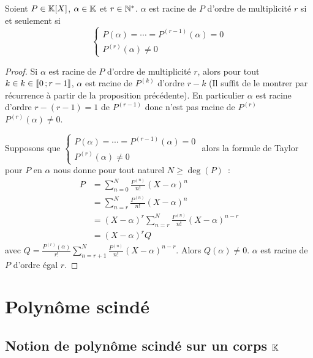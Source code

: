 \begin{prop}
  Soient \(P \in \mathbb{K}[X]\), \(\alpha \in \mathbb{K}\) et \(r \in \mathbb{N}^*\). \(\alpha\) est
  racine de \(P\) d'ordre de multiplicité \(r\) si et seulement si
  \begin{equation}
    \begin{cases}
      P(\alpha) = \cdots = P^{(r-1)}(\alpha) = 0 \\
      P^{(r)}(\alpha) \neq 0
    \end{cases}
  \end{equation}
\end{prop}
\begin{proof}
  Si \(\alpha\) est racine de \(P\) d'ordre de multiplicité \(r\), alors pour
  tout \(k \in k \in \mathopen{\llbracket}0\mathclose{}\mathpunct{};r-1\mathclose{\rrbracket}\), \(\alpha\) est racine de
  \(P^{(k)}\) d'ordre \(r-k\) (Il suffit de le montrer par récurrence à partir
  de la proposition précédente). En particulier \(\alpha\) est racine d'ordre
  \(r-(r-1) = 1\) de \(P^{(r-1)}\) donc n'est pas racine de \(P^{(r)}\)
  \(P^{(r)}(\alpha) \neq 0\).

  Supposons que \(\begin{cases}
    P(\alpha) = \cdots = P^{(r-1)}(\alpha) = 0 \\
    P^{(r)}(\alpha) \neq 0
  \end{cases}\)
  alors la formule de Taylor pour \(P\) en \(\alpha\) nous donne pour tout
  naturel \(N \geqslant \deg(P)\)~:
  \begin{align}
    P &= \sum_{n = 0}^N \frac{P^{(n)}}{n!} {(X-\alpha)}^n \\
    &= \sum_{n = r}^N \frac{P^{(n)}}{n!} {(X-\alpha)}^n \\
    &= {(X-\alpha)}^r \sum_{n = r}^N \frac{P^{(n)}}{n!} {(X-\alpha)}^{n-r}\\
    &= {(X-\alpha)}^r Q
  \end{align}
  avec \(Q = \frac{P^{(r)}(\alpha)}{r!} \sum_{n = r+1}^N \frac{P^{(n)}}{n!}
  (X-\alpha)^{n-r}\). Alors \(Q(\alpha) \neq 0\). \(\alpha\) est racine de \(P\)
  d'ordre égal \(r\).
\end{proof}

\section{Polynôme scindé}

\subsection{Notion de polynôme scindé sur un corps \(\mathbb{K}\)}

